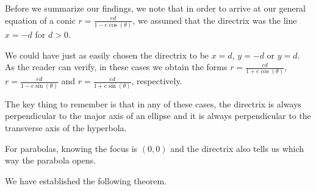 \smallskip

Before we summarize our findings, we note that in order to arrive at our general equation of a conic $r = \frac{ed}{1-e\cos(\theta)}$, we assumed that the directrix was the line $x = -d$ for $d > 0$. 

\smallskip

 We could have just as easily chosen the directrix to be $x = d$, $y = -d$ or $y = d$.  As the reader can verify, in these cases we obtain the forms  $r = \frac{ed}{1+e\cos(\theta)}$,  $r = \frac{ed}{1-e\sin(\theta)}$ and  $r = \frac{ed}{1+e\sin(\theta)}$, respectively. 
 
 \smallskip
 
 The key thing to remember is that in any of these cases, the directrix is always perpendicular to the major axis of an ellipse and it is always perpendicular to the transverse axis of the hyperbola.
 
 \smallskip
 
  For parabolas, knowing the focus is $(0,0)$ and the directrix also tells us which way the parabola opens.  
 
 \smallskip
 
 We have established the following theorem.

\smallskip

